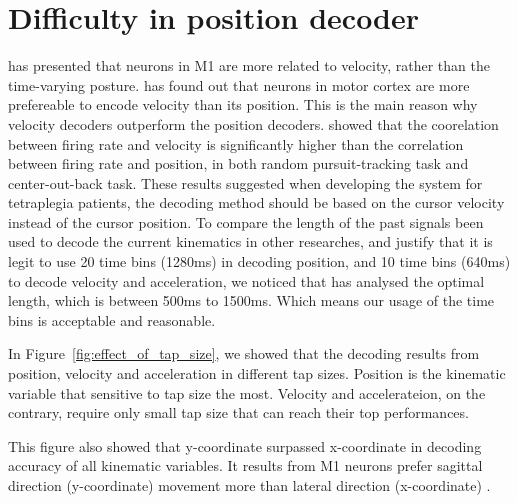 \section{Difficulty in position decoder}
\cite{goodman2019postural} has presented that neurons in M1 are more related to velocity, rather than the time-varying posture.
\cite{okorokova2020decoding} has found out that neurons in motor cortex are more prefereable to encode velocity than its position. 
This is the main reason why velocity decoders outperform the position decoders.
\cite{kim2008neural,dethier2013design} showed that the coorelation between firing rate and velocity is significantly higher than the correlation between firing rate and position, 
in both random pursuit-tracking task and center-out-back task. 
These results suggested when developing the system for tetraplegia patients,
the decoding method should be based on the cursor velocity instead of the cursor position.
To compare the length of the past signals been used to decode the current kinematics in other researches, 
and justify that it is legit to use 20 time bins (1280ms) in decoding position, 
and 10 time bins (640ms) to decode velocity and acceleration,
we noticed that \cite{wu2003neural} has analysed the optimal length, 
which is between 500ms to 1500ms.
Which means our usage of the time bins is acceptable and reasonable.


In Figure~\ref{fig:effect_of_tap_size}, 
we showed that the decoding results from position, velocity and acceleration in different tap sizes.
Position is the kinematic variable that sensitive to tap size the most.
Velocity and accelerateion, on the contrary, require only small tap size that can reach their top performances.

This figure also showed that y-coordinate surpassed x-coordinate in decoding accuracy of all kinematic variables.
It results from M1 neurons prefer sagittal direction (y-coordinate) movement more than lateral direction (x-coordinate) \cite{lillicrap2013preference}.


